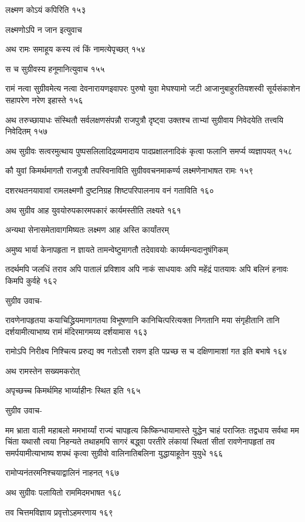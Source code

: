 लक्ष्मण कोऽयं कपिरिति १५३

लक्ष्मणोऽपि न जान इत्युवाच

अथ रामः समाहूय कस्य त्वं किं नामत्येपृच्छत् १५४

स च सुग्रीवस्य हनूमानित्युवाच १५५

रामं नत्वा सुग्रीवमेत्य नत्वा देवनारायणइवापरः पुरुषो युवा मेघश्यामो जटी
आजानुबाहुरतियशस्वी सूर्यसंकाशेन सहापरेण नरेण इहास्ते १५६

अथ तरुच्छायाधः संस्थितौ सर्वलक्षणसंपन्नौ राजपुत्रौ दृष्ट्वा उक्तश्च ताभ्यां सुग्रीवाय
निवेदयेति तत्त्वयि निवेदितम् १५७

अथ सुग्रीवः सत्वरमुत्थाय पुष्पसलिलादिद्रव्यमादाय पादप्रक्षालनादिकं कृत्वा फलानि समर्प्य
व्यज्ञापयत् १५८

कौ युवां किमर्थमागतौ राजपुत्रौ तपस्विनाविति सुग्रीववचनमाकर्ण्य लक्ष्मणेनाभाषत रामः
 १५९

दशरथतनयावावां रामलक्ष्मणौ दुष्टनिग्रह शिष्टपरिपालनाय वनं गताविति १६०

अथ सुग्रीव आह युवयोरुपकारमपकारं कार्यमस्तीति लक्ष्यते १६१

अन्यथा सेनासमेतावागमिष्यतः लक्ष्मण आह अस्ति कार्यांतरम्

अमुष्य भार्या केनापहृता न ज्ञायते तामन्वेष्टुमागतौ तदेवावयोः कार्य्यमन्यदानुषंगिकम्

तदर्थमपि जलधिं तराव अपि पातालं प्रविशाव अपि नाकं साधयावः अपि महेंद्रं पातयावः अपि
बलिनं हनावः किमपि कुर्वहे १६२

सुग्रीव उवाच-

रावणेनापहृतया कयाचिद्ध्रियमाणागतया विभूषणानि कानिचित्परित्यक्ता निगतानि मया
संगृहीतानि तानि दर्शयामीत्याभाष्य रामं मंदिरमागमय्य दर्शयामास १६३

रामोऽपि निरीक्ष्य निश्चित्य प्ररुद्य क्व गतोऽसौ रावण इति पप्रच्छ स च दक्षिणामाशां गत
इति बभाषे १६४

अथ रामस्तेन सख्यमकरोत्

अपृच्छच्च किमर्थमिह भार्य्याहीनः स्थित इति १६५

सुग्रीव उवाच-

मम भ्राता वाली महाबलो ममभार्य्यां राज्यं चापहृत्य किष्किन्धायामास्ते युद्धेन चाहं
पराजितः तद्वधाय सर्वथा मम चिंता यथासौ त्वया निहन्यते तथाहमपि सागरं बद्ध्वा परतीरे
लंकायां स्थितां सीतां रावणेनापहृतां तव समर्पयामीत्याभाष्य शपथं कृत्वा सुग्रीवो
वालिनातिबलिना युद्धायाहूतेन युयुधे १६६

रामोप्यनंतरमनिश्चयाद्वालिनं नाहनत् १६७

अथ सुग्रीवः पलायितो राममिदमभाषत १६८

तव चित्तमविज्ञाय प्रवृत्तोऽहमरणाय १६९

